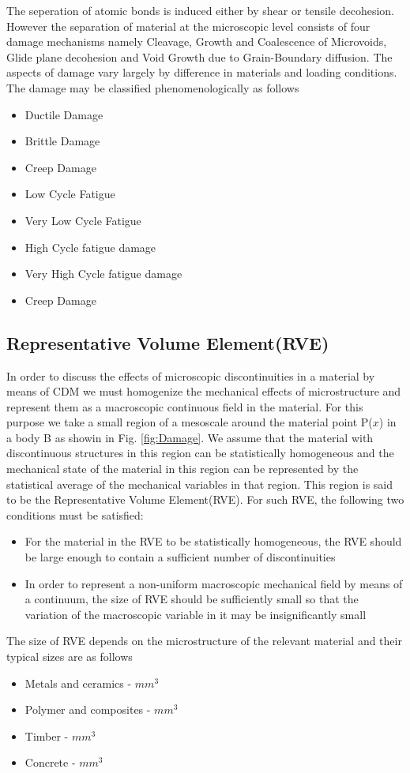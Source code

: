 \documentclass[a4paper,12pt]{extarticle}
\begin{document}
The seperation of atomic bonds is induced either by shear or tensile decohesion. However the separation of material at the microscopic level consists of four damage mechanisms namely Cleavage, Growth and Coalescence of Microvoids, Glide plane decohesion and Void Growth due to Grain-Boundary diffusion.  The aspects of damage vary largely by difference in materials and loading conditions. The damage may be classified phenomenologically as follows
\begin{itemize}
\item Ductile Damage
\item Brittle Damage
\item Creep Damage
\item Low Cycle Fatigue
\item Very Low Cycle Fatigue
\item High Cycle fatigue damage
\item Very High Cycle fatigue damage
\item Creep Damage
\end{itemize}
\subsection{Representative Volume Element(RVE)}
\indent\indent\indent  In order to discuss the effects of microscopic discontinuities in  a material by means of CDM we must homogenize the mechanical effects of microstructure and represent them as a macroscopic continuous field in the material. For this purpose we take a small region of a mesoscale around the material point P($x$) in a body B as showin in Fig. \ref{fig:Damage}. We assume that the  material with discontinuous structures in this region can be statistically homogeneous and the mechanical state of the material in this region can be represented by the statistical average of the mechanical variables in that region. This region is said to be the Representative Volume Element(RVE). For such RVE, the following two conditions must be satisfied:
\begin{itemize}
\item  For the material in the RVE to be statistically homogeneous, the RVE should be large enough to contain a sufficient number of discontinuities
\item In order to represent a non-uniform macroscopic mechanical field by means of a continuum, the size of RVE should be sufficiently small so that the variation of the macroscopic variable in it may be insignificantly small
\end{itemize}
The size of RVE depends on the microstructure of the relevant material and their typical sizes are as follows
\begin{itemize}
\item Metals and ceramics  \;    -    $mm^3$
\item Polymer and composites \;   -   $mm^3$
\item Timber\; - $mm^3$
\item Concrete \; - $mm^3$
\end{itemize}
\end{document}
